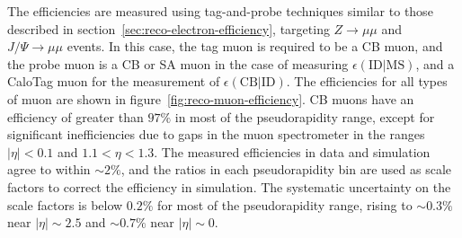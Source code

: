 The efficiencies are measured using tag-and-probe techniques similar to those described in section~\ref{sec:reco-electron-efficiency}, targeting $Z\rightarrow\mu\mu$ and $J/\Psi\rightarrow\mu\mu$ events. In this case, the tag muon is required to be a CB muon, and the probe muon is a CB or SA muon in the case of measuring $\epsilon(\mathrm{ID}|\mathrm{MS})$, and a CaloTag muon for the measurement of $\epsilon(\mathrm{CB}|\mathrm{ID})$. The efficiencies for all types of muon are shown in figure~\ref{fig:reco-muon-efficiency}. CB muons have an efficiency of greater than $97\%$ in most of the pseudorapidity range, except for significant inefficiencies due to gaps in the muon spectrometer in the ranges $|\eta|<0.1$ and $1.1<\eta<1.3$. The measured efficiencies in data and simulation agree to within $\sim2\%$, and the ratios in each pseudorapidity bin are used as scale factors to correct the efficiency in simulation. The systematic uncertainty on the scale factors is below $0.2\%$ for most of the pseudorapidity range, rising to $\sim 0.3\%$ near $|\eta|\sim 2.5$ and $\sim0.7\%$ near $|\eta|\sim 0$. 

